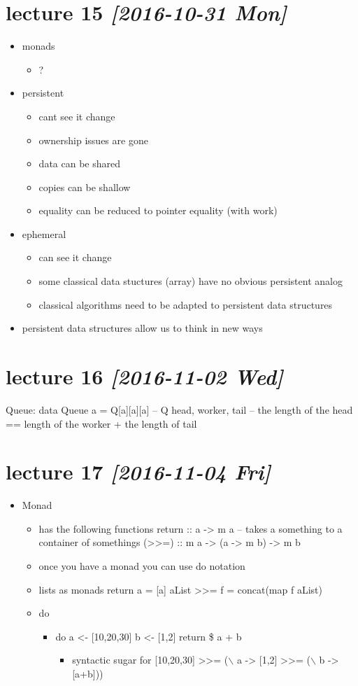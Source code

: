 \documentclass[11pt]{article}
\begin{document}
\section{lecture 15 \textit{[2016-10-31 Mon]}}
\label{sec-13}
\begin{itemize}
\item monads
\begin{itemize}
\item ?
\end{itemize}
\item persistent
\begin{itemize}
\item cant see it change
\item ownership issues are gone
\item data can be shared
\item copies can be shallow
\item equality can be reduced to pointer equality (with work)
\end{itemize}
\item ephemeral
\begin{itemize}
\item can see it change
\item some classical data stuctures (array) have no obvious persistent analog
\item classical algorithms need to be adapted to persistent data structures
\end{itemize}
\item persistent data structures allow us to think in new ways
\end{itemize}
\section{lecture 16 \textit{[2016-11-02 Wed]}}
\label{sec-14}
Queue:
data Queue a = Q[a][a][a] -- Q head, worker, tail
-- the length of the head == length of the worker + the length of tail
\section{lecture 17 \textit{[2016-11-04 Fri]}}
\label{sec-15}
\begin{itemize}
\item Monad
\begin{itemize}
\item has the following functions
return :: a -> m a -- takes a something to a container of somethings
(>>=) :: m a -> (a -> m b) -> m b
\item once you have a monad you can use do notation
\item lists as monads
return a = [a]
aList >>= f = concat(map f aList)
\item do
\begin{itemize}
\item do
a <- [10,20,30]
b <- [1,2]
return \$ a + b
\begin{itemize}
\item syntactic sugar for
[10,20,30] >>= ($\backslash$ a ->
  [1,2] >>= ($\backslash$ b -> [a+b]))
\end{itemize}
\end{itemize}
\end{itemize}
\end{itemize}
\end{document}
